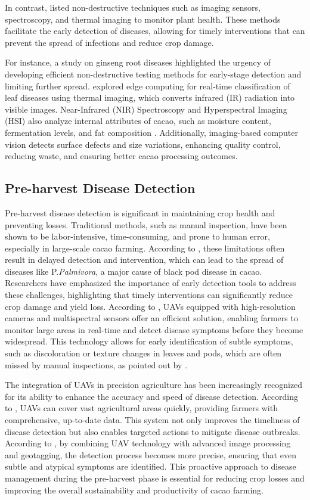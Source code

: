 In contrast, \cite{Alvarado2023} listed non-destructive techniques such as imaging sensors, spectroscopy, and thermal imaging to monitor plant health. These methods facilitate the early detection of diseases, allowing for timely interventions that can prevent the spread of infections and reduce crop damage.

For instance, a study on ginseng root diseases highlighted the urgency of developing efficient non-destructive testing methods for early-stage detection and limiting further spread. \cite{Silva2024} explored edge computing for real-time classification of leaf diseases using thermal imaging, which converts infrared (IR) radiation into visible images. Near-Infrared (NIR) Spectroscopy and Hyperspectral Imaging (HSI) also analyze internal attributes of cacao, such as moisture content, fermentation levels, and fat composition \citep{Alvarado2023}. Additionally, imaging-based computer vision detects surface defects and size variations, enhancing quality control, reducing waste, and ensuring better cacao processing outcomes.

\subsection*{Pre-harvest Disease Detection}
Pre-harvest disease detection is significant in maintaining crop health and preventing losses. Traditional methods, such as manual inspection, have been shown to be labor-intensive, time-consuming, and prone to human error, especially in large-scale cacao farming. According to \cite{Tan2018}, these limitations often result in delayed detection and intervention, which can lead to the spread of diseases like P.\textit{Palmivora}, a major cause of black pod disease in cacao. Researchers have emphasized the importance of early detection tools to address these challenges, highlighting that timely interventions can significantly reduce crop damage and yield loss. According to \cite{Yadav2024}, UAVs equipped with high-resolution cameras and multispectral sensors offer an efficient solution, enabling farmers to monitor large areas in real-time and detect disease symptoms before they become widespread. This technology allows for early identification of subtle symptoms, such as discoloration or texture changes in leaves and pods, which are often missed by manual inspections, as pointed out by \cite{Upadhyay2025}.

The integration of UAVs in precision agriculture has been increasingly recognized for its ability to enhance the accuracy and speed of disease detection. According to \cite{Vyas2023}, UAVs can cover vast agricultural areas quickly, providing farmers with comprehensive, up-to-date data. This system not only improves the timeliness of disease detection but also enables targeted actions to mitigate disease outbreaks. According to \cite{Taesiri2023}, by combining UAV technology with advanced image processing and geotagging, the detection process becomes more precise, ensuring that even subtle and atypical symptoms are identified. This proactive approach to disease management during the pre-harvest phase is essential for reducing crop losses and improving the overall sustainability and productivity of cacao farming.

